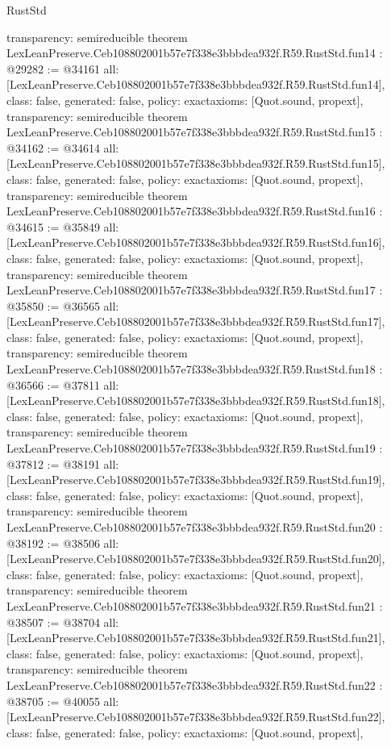 \begin{lexlean}{RustStd}
\begin{coremodule}
{  transparency: semireducible
}
theorem LexLeanPreserve.Ceb108802001b57e7f338e3bbbdea932f.R59.RustStd.fun14 : @29282 := @34161 {
  all: [LexLeanPreserve.Ceb108802001b57e7f338e3bbbdea932f.R59.RustStd.fun14],
  class: false,
  generated: false,
  policy: exact{axioms: [Quot.sound, propext]},
  transparency: semireducible
}
theorem LexLeanPreserve.Ceb108802001b57e7f338e3bbbdea932f.R59.RustStd.fun15 : @34162 := @34614 {
  all: [LexLeanPreserve.Ceb108802001b57e7f338e3bbbdea932f.R59.RustStd.fun15],
  class: false,
  generated: false,
  policy: exact{axioms: [Quot.sound, propext]},
  transparency: semireducible
}
theorem LexLeanPreserve.Ceb108802001b57e7f338e3bbbdea932f.R59.RustStd.fun16 : @34615 := @35849 {
  all: [LexLeanPreserve.Ceb108802001b57e7f338e3bbbdea932f.R59.RustStd.fun16],
  class: false,
  generated: false,
  policy: exact{axioms: [Quot.sound, propext]},
  transparency: semireducible
}
theorem LexLeanPreserve.Ceb108802001b57e7f338e3bbbdea932f.R59.RustStd.fun17 : @35850 := @36565 {
  all: [LexLeanPreserve.Ceb108802001b57e7f338e3bbbdea932f.R59.RustStd.fun17],
  class: false,
  generated: false,
  policy: exact{axioms: [Quot.sound, propext]},
  transparency: semireducible
}
theorem LexLeanPreserve.Ceb108802001b57e7f338e3bbbdea932f.R59.RustStd.fun18 : @36566 := @37811 {
  all: [LexLeanPreserve.Ceb108802001b57e7f338e3bbbdea932f.R59.RustStd.fun18],
  class: false,
  generated: false,
  policy: exact{axioms: [Quot.sound, propext]},
  transparency: semireducible
}
theorem LexLeanPreserve.Ceb108802001b57e7f338e3bbbdea932f.R59.RustStd.fun19 : @37812 := @38191 {
  all: [LexLeanPreserve.Ceb108802001b57e7f338e3bbbdea932f.R59.RustStd.fun19],
  class: false,
  generated: false,
  policy: exact{axioms: [Quot.sound, propext]},
  transparency: semireducible
}
theorem LexLeanPreserve.Ceb108802001b57e7f338e3bbbdea932f.R59.RustStd.fun20 : @38192 := @38506 {
  all: [LexLeanPreserve.Ceb108802001b57e7f338e3bbbdea932f.R59.RustStd.fun20],
  class: false,
  generated: false,
  policy: exact{axioms: [Quot.sound, propext]},
  transparency: semireducible
}
theorem LexLeanPreserve.Ceb108802001b57e7f338e3bbbdea932f.R59.RustStd.fun21 : @38507 := @38704 {
  all: [LexLeanPreserve.Ceb108802001b57e7f338e3bbbdea932f.R59.RustStd.fun21],
  class: false,
  generated: false,
  policy: exact{axioms: [Quot.sound, propext]},
  transparency: semireducible
}
theorem LexLeanPreserve.Ceb108802001b57e7f338e3bbbdea932f.R59.RustStd.fun22 : @38705 := @40055 {
  all: [LexLeanPreserve.Ceb108802001b57e7f338e3bbbdea932f.R59.RustStd.fun22],
  class: false,
  generated: false,
  policy: exact{axioms: [Quot.sound, propext]},
}
\end{coremodule}
\end{lexlean}
